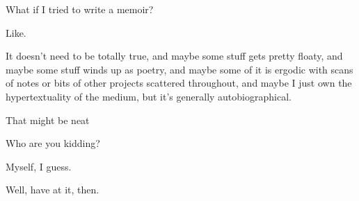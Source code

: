 \noindent What if I tried to write a memoir?

Like.

It doesn't need to be totally true, and maybe some stuff gets pretty floaty, and maybe some stuff winds up as poetry, and maybe some of it is ergodic with scans of notes or bits of other projects scattered throughout, and maybe I just own the hypertextuality of the medium, but it's generally autobiographical.

That might be neat

\begin{ally}
Who are you kidding?
\end{ally}
Myself, I guess.

\begin{ally}
Well, have at it, then.
\end{ally}
\newpage

